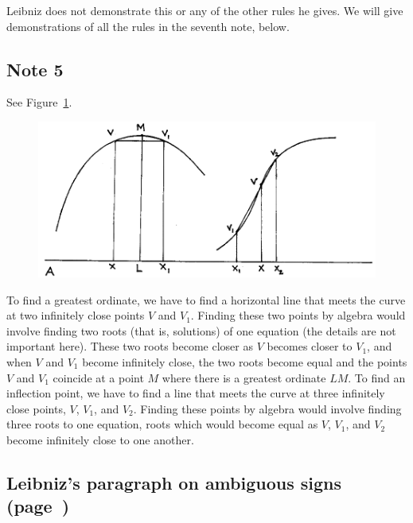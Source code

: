 \documentclass[twoside,openright]{article}
\begin{document}
Leibniz does not demonstrate this or any of the other rules he gives.
We will give demonstrations of all the rules in the seventh note,
below.

\subsection*{Note 5}
\label{cnm5}

See Figure~\ref{maxinf}. 
\begin{figure}[ht]
\begin{center}
\includegraphics[width=\textwidth]{fig/Figure10}
\caption{}
\label{maxinf}
\vspace{-10pt}
\end{center}
\end{figure} To find a greatest ordinate, we have to find a horizontal
line that meets the curve at two infinitely close points $V$ and
$V_1$.  Finding these two points by algebra would involve finding two
roots (that is, solutions) of one equation (the details are not
important here).  These two roots become closer as $V$ becomes closer
to $V_1$, and when $V$ and $V_1$ become infinitely close, the two
roots become equal and the points $V$ and $V_1$ coincide at a point
$M$ where there is a greatest ordinate $LM$.  To find an inflection
point, we have to find a line that meets the curve at three infinitely
close points, $V$, $V_1$, and $V_2$.  Finding these points by algebra
would involve finding three roots to one equation, roots which would
become equal as $V$, $V_1$, and $V_2$ become infinitely close to one
another.

\subsection*{Leibniz's paragraph on ambiguous signs (page~\pageref{ambsigns})}
\label{ompar}
\end{document}

